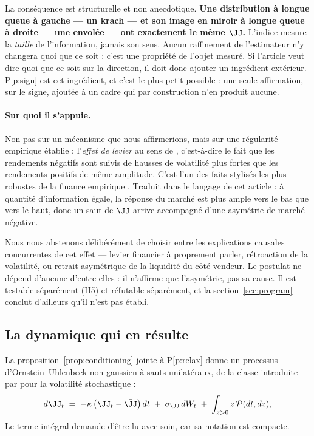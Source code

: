 La conséquence est structurelle et non anecdotique. \textbf{Une distribution à
longue queue à gauche --- un krach --- et son image en miroir à longue queue à
droite --- une envolée --- ont exactement le même $\JJ$.} L'indice mesure la
\emph{taille} de l'information, jamais son sens. Aucun raffinement de
l'estimateur n'y changera quoi que ce soit : c'est une propriété de l'objet
mesuré. Si l'article veut dire quoi que ce soit sur la direction, il doit donc
ajouter un ingrédient extérieur. P\ref{p:sign} est cet ingrédient, et c'est le
plus petit possible : une seule affirmation, sur le signe, ajoutée à un cadre
qui par construction n'en produit aucune.

\paragraph{Sur quoi il s'appuie.} Non pas sur un mécanisme que nous
affirmerions, mais sur une régularité empirique établie : l'\emph{effet de
levier} au sens de \citet{black1976}, c'est-à-dire le fait que les rendements
négatifs sont suivis de hausses de volatilité plus fortes que les rendements
positifs de même amplitude. C'est l'un des faits stylisés les plus robustes de
la finance empirique \citep{christie1982,engle1993,nelson1991}. Traduit dans le
langage de cet article : à quantité d'information égale, la réponse du marché
est plus ample vers le bas que vers le haut, donc un saut de $\JJ$ arrive
accompagné d'une asymétrie de marché négative.

Nous nous abstenons délibérément de choisir entre les explications causales
concurrentes de cet effet --- levier financier à proprement parler, rétroaction
de la volatilité, ou retrait asymétrique de la liquidité du côté vendeur. Le
postulat ne dépend d'aucune d'entre elles : il n'affirme que l'asymétrie, pas sa
cause. Il est testable séparément (H5) et réfutable séparément, et la
section~\ref{sec:program} conclut d'ailleurs qu'il n'est pas établi.

\subsection{La dynamique qui en résulte}

La proposition~\ref{prop:conditioning} jointe à P\ref{p:relax} donne un processus
d'Ornstein--Uhlenbeck non gaussien à sauts unilatéraux, de la classe introduite
par \citet{bns2001} pour la volatilité stochastique :
\begin{equation}
\label{eq:ou}
d\JJ_t \;=\; -\kappa\left(\JJ_t-\bar\JJ\right)dt \;+\; \sigma_\JJ\,dW_t \;+\; \int_{z>0} z\,\mathcal{P}(dt,dz),
\end{equation}
Le terme intégral demande d'être lu avec soin, car sa notation est compacte.

